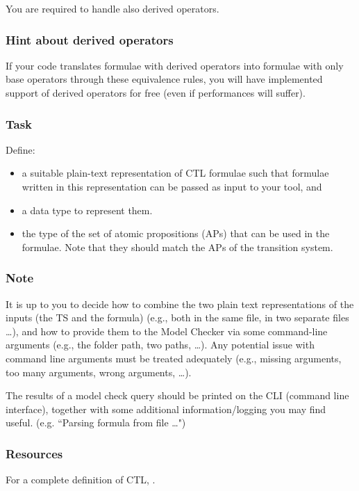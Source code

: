 \documentclass{article}
\begin{document}
You are required to handle also derived operators.

\subsubsection*{Hint about derived operators}
If your code translates formulae with derived operators into formulae 
with only base operators through these equivalence rules, you will have implemented support of 
derived operators for free (even if performances will suffer).

\color{red}
\subsubsection*{Task}
Define:
\begin{itemize}
    \item a suitable plain-text representation of CTL formulae such that formulae written in this representation can be passed as input to your tool, and 
    \item a data type to represent them.
    \item the type of the set of atomic propositions (APs) that can be used in the formulae. Note that they should 
            match the APs of the transition system.
\end{itemize}
\color{black}

\subsubsection*{Note}
It is up to you to decide how to combine the two plain text representations of the inputs (the TS and the formula) 
(e.g., both in the same file, in two separate files \dots), 
and how to provide them to the Model Checker via some command-line arguments 
(e.g., the folder path, two paths, \dots). 
Any potential issue with command line arguments must be treated adequately 
(e.g., missing arguments, too many arguments, wrong arguments, \dots).

The results of a model check query should be printed on the CLI (command line interface), 
together with some additional information/logging you may find useful.
(e.g. ``Parsing formula from file \dots")

\subsubsection*{Resources}
For a complete definition of CTL, \cite[Paragraph 6.2 (in particular 6.1.1 and 6.1.2)]{BaKa}.
\end{document}
